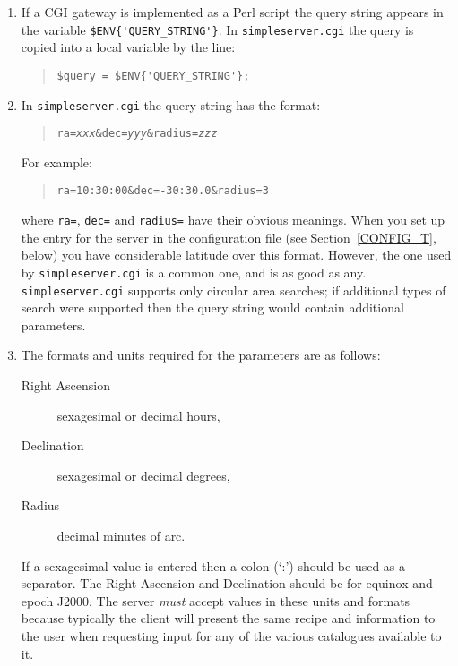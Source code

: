 \documentclass[twoside,11pt]{article}
\renewcommand{\_}{\texttt{\symbol{95}}}
\begin{document}
\begin{enumerate}

  \item If a CGI gateway is implemented as a Perl script the query
   string appears in the variable \verb-$ENV{'QUERY_STRING'}-.
   In {\tt simpleserver.cgi} the query is copied into a local variable
   by the line:

  \begin{quote}
   \verb-$query = $ENV{'QUERY_STRING'};-
  \end{quote}

  \item In {\tt simpleserver.cgi} the query string has the format:

  \begin{quote}
   {\tt ra={\it xxx}\&dec={\it yyy}\&radius={\it zzz}}
  \end{quote}

   For example:

  \begin{quote}
   {\tt ra=10:30:00\&dec=-30:30.0\&radius=3}
  \end{quote}

   where {\tt ra=}, {\tt dec=} and {\tt radius=} have their obvious
   meanings.  When you set up the entry for the server in the configuration
   file (see Section~\ref{CONFIG_T}, below) you have considerable latitude
   over this format.  However, the one used by {\tt simpleserver.cgi} is a
   common one, and is as good as any.  {\tt simpleserver.cgi} supports
   only circular area searches; if additional types of search were
   supported then the query string would contain additional parameters.

  \item The formats and units required for the parameters are as follows:

  \begin{description}

    \item[Right Ascension] sexagesimal or decimal hours,

    \item[Declination] sexagesimal or decimal degrees,

    \item[Radius] decimal minutes of arc.

  \end{description}

   If a sexagesimal value is entered then a colon (`:') should be used
   as a separator.  The Right Ascension and Declination should be for
   equinox and epoch J2000.  The server {\it must}\/ accept values in
   these units and formats because typically the client will present
   the same recipe and information to the user when requesting input
   for any of the various catalogues available to it.

\end{enumerate}
\end{document}
